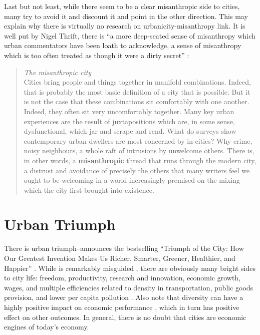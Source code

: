 \documentclass[10pt, letterpaper]{article}
\begin{document}
\begin{spacing}{1.4}
Last but not least, while there seem to be a clear misanthropic side to cities,
many try to avoid it and discount it and point in the other direction. This may
explain why there is virtually no research on urbanicity-misanthropy link. It is well put by Nigel Thrift, there is ``a more deep-seated sense of
misanthropy which urban commentators have been loath to acknowledge, a sense of misanthropy which is
too often treated as though it were a dirty secret'' \citep[p. 134]{thrift05}: 
\begin{quote}
  \textit{The misanthropic city}\\
  Cities bring people and things together in manifold combinations. Indeed, that is probably the most basic
definition of a city that is possible. But it is not the case that these combinations sit comfortably with one
another. Indeed, they often sit very uncomfortably together. Many key urban experiences are the result of
juxtapositions which are, in some sense, dysfunctional, which jar and scrape and rend. What do surveys
show contemporary urban dwellers are most concerned by in cities? Why crime, noisy neighbours, a whole
raft of intrusions by unwelcome others. There is, in other words, a \textbf{misanthropic} thread that runs through
the modern city, a distrust and avoidance of precisely the others that many writers feel we ought to be
welcoming in a world increasingly premised on the mixing which the city first
brought into existence. \citep[p. 140 (``misanthropy'' bolded by us]{thrift05}
\end{quote}

\section*{Urban Triumph}

There is urban triumph--announces the bestselling ``Triumph of the City: How Our Greatest
   Invention Makes Us Richer, Smarter, Greener, Healthier, and Happier''
   \citep{glaeser11}. While \citet{glaeser11} is remarkably misguided
   \citep{aokCityBook15,peck16}, there are obviously many bright sides to city
   life: freedom, productivity, research and innovation, economic growth, wages, and multiple efficiencies related to
density in transportation, public goods provision, and lower per capita pollution \cite{tonnies57,osullivan09,meyer13,rosenthal02,bettencourt10}.
 Also note that diversity can have a highly positive impact on  economic
performance  \citep[e.g.,][]{rodriguez2019does}, which in turn has positive
effect on other outcomes. 
In general, there is no doubt that cities are economic engines of today's economy.
%


\end{spacing}
\end{document}
